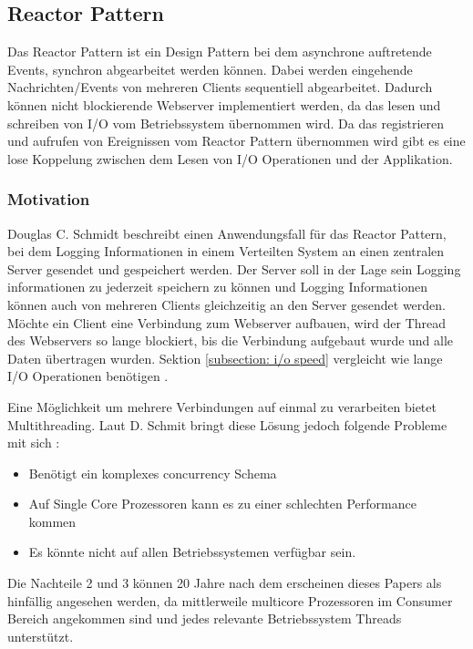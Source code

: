 \subsection{Reactor Pattern}
\label{section:Reactor Pattern}

Das Reactor Pattern ist ein Design Pattern bei dem asynchrone auftretende Events, synchron abgearbeitet werden können. Dabei werden eingehende Nachrichten/Events von mehreren Clients sequentiell abgearbeitet. Dadurch können nicht blockierende Webserver implementiert werden, da das lesen und schreiben von I/O vom Betriebssystem übernommen wird. Da das registrieren und aufrufen von Ereignissen vom Reactor Pattern übernommen wird gibt es eine lose Koppelung zwischen dem Lesen von I/O Operationen und der Applikation. \cite[p. 1]{Sch95}


\subsubsection{Motivation}

Douglas C. Schmidt beschreibt einen Anwendungsfall für das Reactor Pattern, bei dem Logging Informationen in einem Verteilten System an einen zentralen Server gesendet und gespeichert werden. Der Server soll in der Lage sein Logging informationen zu jederzeit speichern zu können und Logging Informationen können auch von mehreren Clients gleichzeitig an den Server gesendet werden. Möchte ein Client eine Verbindung zum Webserver aufbauen, wird der Thread des Webservers so lange blockiert, bis die Verbindung aufgebaut wurde und alle Daten übertragen wurden. Sektion \ref{subsection: i/o speed} vergleicht wie lange I/O Operationen benötigen \cite[p. 1]{Sch95}.

Eine Möglichkeit um mehrere Verbindungen auf einmal zu verarbeiten bietet Multithreading. Laut D. Schmit bringt diese Lösung jedoch folgende Probleme mit sich \cite[p. 2]{Sch95}:

\begin{itemize}
  \item Benötigt ein komplexes concurrency Schema
  \item Auf Single Core Prozessoren kann es zu einer schlechten Performance kommen
  \item Es könnte nicht auf allen Betriebssystemen verfügbar sein.
\end{itemize}

Die Nachteile 2 und 3 können 20 Jahre nach dem erscheinen dieses Papers als hinfällig angesehen werden, da mittlerweile multicore Prozessoren im Consumer Bereich angekommen sind und jedes relevante Betriebssystem Threads unterstützt.


